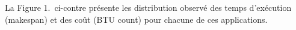 \documentclass[a0paper,portrait]{tikzposter}
\begin{document}
\begin{columns}
{La Figure 1.\ ci-contre présente les distribution observé des temps d'exécution
(makespan) et des coût (BTU count) pour chacune de ces applications. 
}
\end{columns}
\end{document}
